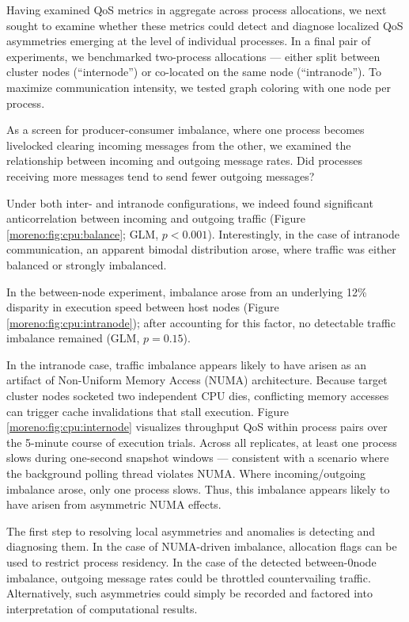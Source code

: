 Having examined QoS metrics in aggregate across process allocations, we next sought to examine whether these metrics could detect and diagnose localized QoS asymmetries emerging at the level of individual processes.
In a final pair of experiments, we benchmarked two-process allocations --- either split between cluster nodes (``internode'') or co-located on the same node (``intranode'').
To maximize communication intensity, we tested graph coloring with one node per process.

As a screen for producer-consumer imbalance, where one process becomes livelocked clearing incoming messages from the other, we examined the relationship between incoming and outgoing message rates.
Did processes receiving more messages tend to send fewer outgoing messages?

Under both inter- and intranode configurations, we indeed found significant anticorrelation between incoming and outgoing traffic (Figure \ref{moreno:fig:cpu:balance}; GLM, $p < 0.001$).
Interestingly, in the case of intranode communication, an apparent bimodal distribution arose, where traffic was either balanced or strongly imbalanced.

In the between-node experiment, imbalance arose from an underlying 12\% disparity in execution speed between host nodes (Figure \ref{moreno:fig:cpu:intranode}); after accounting for this factor, no detectable traffic imbalance remained (GLM, $p = 0.15$).

In the intranode case, traffic imbalance appears likely to have arisen as an artifact of Non-Uniform Memory Access (NUMA) architecture.
Because target cluster nodes socketed two independent CPU dies, conflicting memory accesses can trigger cache invalidations that stall execution.
Figure \ref{moreno:fig:cpu:internode} visualizes throughput QoS within process pairs over the 5-minute course of execution trials.
Across all replicates, at least one process slows during one-second snapshot windows --- consistent with a scenario where the background polling thread violates NUMA.
Where incoming/outgoing imbalance arose, only one process slows.
Thus, this imbalance appears likely to have arisen from asymmetric NUMA effects.

The first step to resolving local asymmetries and anomalies is detecting and diagnosing them.
In the case of NUMA-driven imbalance, allocation flags can be used to restrict process residency.
In the case of the detected between-0node imbalance, outgoing message rates could be throttled countervailing traffic.
Alternatively, such asymmetries could simply be recorded and factored into interpretation of computational results.
